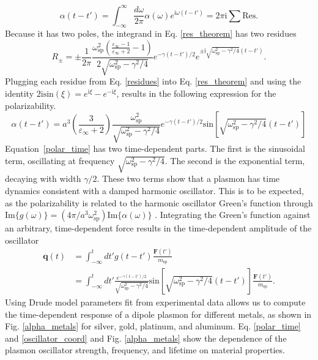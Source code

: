 \documentclass [11pt, proquest] {uwthesis}[2016/11/22]
\begin{document}
\begin{equation}
\alpha(t-t') = \int_{-\infty}^{\infty}\frac{d\omega}{2\pi}\alpha(\omega)e^{\textrm{i}\omega (t-t')} = 2\pi\textrm{i}\sum\textrm{Res}.
\label{res_theorem}
\end{equation}
Because it has two poles, the integrand in Eq. \ref{res_theorem} has two residues
\begin{equation}
R_{\pm} = \pm\frac{1}{2\pi}\frac{\omega_{\textrm{sp}}^2\left(\frac{\varepsilon_{\infty}-1}{\varepsilon_{\infty}+2}-1\right)}{2\sqrt{\omega_\textrm{sp}^2-\gamma^2/4}}e^{-\gamma (t-t')/2}e^{\pm\textrm{i}\sqrt{\omega_\textrm{sp}^2-\gamma^2/4}(t-t')}.
\label{residues}
\end{equation}
Plugging each residue from Eq. \ref{residues} into Eq. \ref{res_theorem} and using the identity $2\textrm{i}\textrm{sin}(\xi) = e^{\textrm{i}\xi} - e^{-\textrm{i}\xi}$, results in the following expression for the polarizability.
\begin{equation}
\alpha(t-t') = a^3\left(\frac{3}{\varepsilon_{\infty}+2}\right)\frac{\omega_{\textrm{sp}}^2}{\sqrt{\omega_\textrm{sp}^2-\gamma^2/4}}e^{-\gamma (t-t')/2}\textrm{sin}\left[\sqrt{\omega_{\textrm{sp}}^2-\gamma^2/4}(t-t')\right]
\label{polar_time}
\end{equation}
Equation~\ref{polar_time} has two time-dependent parts. The first is the sinusoidal term, oscillating at frequency $\sqrt{\omega_\textrm{sp}^2-\gamma^2/4}$. The second is the exponential term, decaying with width $\gamma/2$. These two terms show that a plasmon has time dynamics consistent with a damped harmonic oscillator. This is to be expected, as the polarizability is related to the harmonic oscillator Green's function through $\textrm{Im}\{g(\omega)\} = (4\pi/a^3\omega_{\textrm{sp}}^2)\textrm{Im}\{\alpha(\omega)\}$ \cite{ARPC,Quillin}. Integrating the Green's function against an arbitrary, time-dependent force results in the time-dependent amplitude of the oscillator
\begin{equation}
\begin{aligned}
\textbf{q}(t) & = \int_{-\infty}^{t}dt' g(t-t')\frac{\textbf{F}(t')}{m_{\textrm{sp}}}\\
&= \int_{-\infty}^{t}dt' \frac{e^{-\gamma(t-t')/2}}{\sqrt{\omega_{\textrm{sp}}^2-\gamma^2/4}}\textrm{sin}\left[\sqrt{\omega_{\textrm{sp}}^2-\gamma^2/4}(t-t')\right]\frac{\textbf{F}(t')}{m_{\textrm{sp}}}.
\label{oscillator_coord}
\end{aligned}
\end{equation}
Using Drude model parameters fit from experimental data \cite{JC,Rakic,Weaver,Segall} allows us to compute the time-dependent response of a dipole plasmon for different metals, as shown in Fig. \ref{alpha_metals} for silver, gold, platinum, and aluminum. Eq. \ref{polar_time} and \ref{oscillator_coord} and Fig. \ref{alpha_metals} show the dependence of the plasmon oscillator strength, frequency, and lifetime on material properties.
\end{document}
